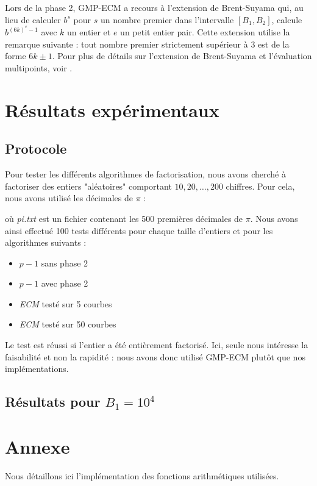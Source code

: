 \documentclass[11pt,a4paper]{article}
\begin{document}
Lors de la phase 2, \textsf{GMP-ECM} a recours à l'extension de Brent-Suyama qui, au lieu de calculer $b^s$ pour $s$ un nombre premier dans l'intervalle $[B_1, B_2]$, calcule $b^{(6k)^e - 1}$ avec $k$ un entier et $e$ un petit entier pair. Cette extension utilise la remarque suivante : tout nombre premier strictement supérieur à 3 est de la forme $6k \pm 1$. Pour plus de détails sur l'extension de Brent-Suyama et l'évaluation multipoints, voir \cite{zimmerman}.

\section{Résultats expérimentaux}

\subsection{Protocole}
Pour tester les différents algorithmes de factorisation, nous avons cherché à factoriser des entiers "aléatoires" comportant $10, 20, \ldots, 200$ chiffres. Pour cela, nous avons utilisé les décimales de $\pi$ : 



où \textit{pi.txt} est un fichier contenant les 500 premières décimales de $\pi$. Nous avons ainsi effectué 100 tests différents pour chaque taille d'entiers et pour les algorithmes suivants :
\begin{itemize}
\item \textit{$p-1$} sans phase 2
\item \textit{$p-1$} avec phase 2
\item \textit{ECM} testé sur 5 courbes
\item \textit{ECM} testé sur 50 courbes
\end{itemize}
\medskip
Le test est réussi si l'entier a été entièrement factorisé. Ici, seule nous intéresse la faisabilité et non la rapidité : nous avons donc utilisé \textsf{GMP-ECM} plutôt que nos implémentations. 

\subsection{Résultats pour $B_1=10^4$}




\section{Annexe}
Nous détaillons ici l'implémentation des fonctions arithmétiques utilisées.
\end{document}
